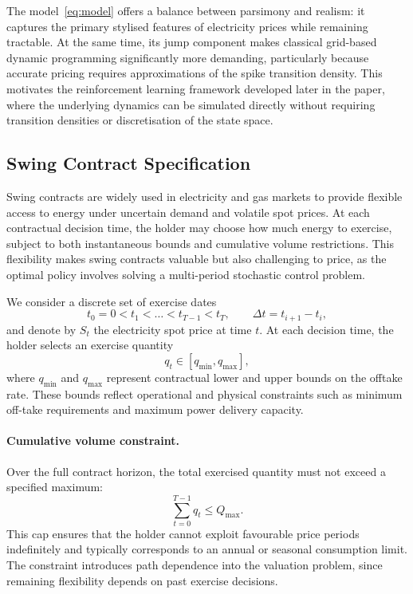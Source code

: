 \documentclass[a4paper,fleqn]{cas-dc}
\begin{document}
The model~\eqref{eq:model} offers a balance between parsimony and realism: it captures the primary stylised features of electricity prices while remaining tractable. At the same time, its jump component makes classical grid-based dynamic programming significantly more demanding, particularly because accurate pricing requires approximations of the spike transition density. This motivates the reinforcement learning framework developed later in the paper, where the underlying dynamics can be simulated directly without requiring transition densities or discretisation of the state space.
\subsection{Swing Contract Specification}

Swing contracts are widely used in electricity and gas markets to provide flexible access to energy under uncertain demand and volatile spot prices. At each contractual decision time, the holder may choose how much energy to exercise, subject to both instantaneous bounds and cumulative volume restrictions. This flexibility makes swing contracts valuable but also challenging to price, as the optimal policy involves solving a multi-period stochastic control problem.

We consider a discrete set of exercise dates
\[
t_0 = 0 < t_1 < \dots < t_{T-1} < t_T, 
\qquad 
\Delta t = t_{i+1} - t_i,
\]
and denote by \(S_t\) the electricity spot price at time \(t\). At each decision time, the holder selects an exercise quantity
\[
q_t \in [q_{\min}, q_{\max}],
\]
where \(q_{\min}\) and \(q_{\max}\) represent contractual lower and upper bounds on the offtake rate. These bounds reflect operational and physical constraints such as minimum off-take requirements and maximum power delivery capacity.

\paragraph{Cumulative volume constraint.}
Over the full contract horizon, the total exercised quantity must not exceed a specified maximum:
\[
\sum_{t=0}^{T-1} q_t \le Q_{\max}.
\]
This cap ensures that the holder cannot exploit favourable price periods indefinitely and typically corresponds to an annual or seasonal consumption limit. The constraint introduces path dependence into the valuation problem, since remaining flexibility depends on past exercise decisions.
\end{document}
